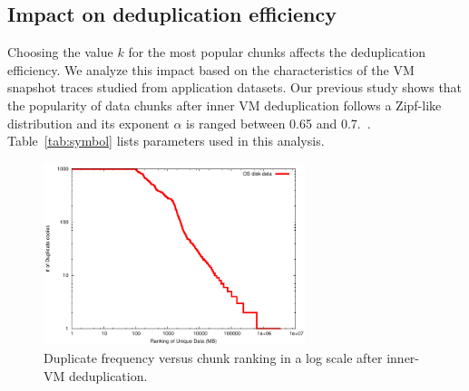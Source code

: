 \subsection{Impact on deduplication efficiency}
Choosing the value  $k$ for the most popular chunks affects the deduplication efficiency.
We analyze this impact based on the characteristics  of the VM snapshot traces
studied from  application datasets.
Our previous study shows that the popularity of data chunks after inner VM deduplication follows 
a Zipf-like distribution\cite{Breslau1999a} and its
exponent $\alpha$ is ranged between 0.65  and  0.7.~\cite{WeiZhangIEEE}. 
Table~\ref{tab:symbol} lists parameters used in this analysis.

\begin{figure}
\centering
 \includegraphics[width=3in]{figures/log-log-disk}
\caption{Duplicate frequency versus  chunk ranking in a log scale after inner-VM deduplication.}
\label{fig:Datazipf}
\end{figure}

